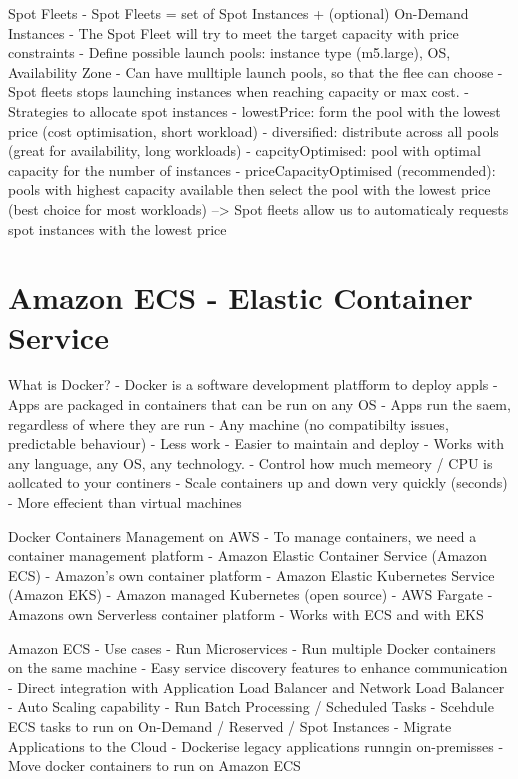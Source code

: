 \documentclass[11pt]{book}
\begin{document}

    Spot Fleets
    - Spot Fleets = set of Spot Instances + (optional) On-Demand Instances
    - The Spot Fleet will try to meet the target capacity with price constraints
    - Define possible launch pools: instance type (m5.large), OS, Availability Zone
    - Can have mulltiple launch pools, so that the flee can choose
    - Spot fleets stops launching instances when reaching capacity or max cost.
    - Strategies to allocate spot instances
    - lowestPrice: form the pool with the lowest price (cost optimisation, short workload)
    - diversified: distribute across all pools (great for availability, long workloads)
    - capcityOptimised: pool with optimal capacity for the number of instances
    - priceCapacityOptimised (recommended): pools with highest capacity available then select the pool with the lowest price (best choice for most workloads)
    --> Spot fleets allow us to automaticaly requests spot instances with the lowest price

    \section{Amazon ECS - Elastic Container Service}
    What is Docker?
    - Docker is a software development platfform to deploy appls
    - Apps are packaged in containers that can be run on any OS
    - Apps run the saem, regardless of where they are run
    - Any machine (no compatibilty issues, predictable behaviour)
    - Less work
    - Easier to maintain and deploy
    - Works with any language, any OS, any technology.
    - Control how much memeory / CPU is aollcated to your continers
    - Scale containers up and down very quickly (seconds)
    - More effecient than virtual machines

    Docker Containers Management on AWS
    - To manage containers, we need a container management platform
    - Amazon Elastic Container Service (Amazon ECS)
    - Amazon's own container platform
    - Amazon Elastic Kubernetes Service (Amazon EKS)
    - Amazon managed Kubernetes (open source)
    - AWS Fargate
    - Amazons own Serverless container platform
    - Works with ECS and with EKS

    Amazon ECS - Use cases
    - Run Microservices
    - Run multiple Docker containers on the same machine
    - Easy service discovery features to enhance communication
    - Direct integration with Application Load Balancer and Network Load Balancer
    - Auto Scaling capability
    - Run Batch Processing / Scheduled Tasks
    - Scehdule ECS tasks to run on On-Demand / Reserved / Spot Instances
    - Migrate Applications to the Cloud
    - Dockerise legacy applications runngin on-premisses
    - Move docker containers to run on Amazon ECS
\end{document}
